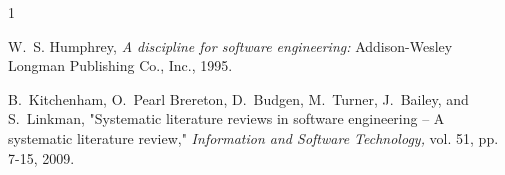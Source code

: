 \documentclass[conference,compsoc]{IEEEtran}
\begin{document}


%
%
%
\begin{thebibliography}{1}

W.~S. Humphrey, \emph{A discipline for software engineering:} Addison-Wesley Longman Publishing Co., Inc., 1995.

B.~Kitchenham, O.~Pearl Brereton, D.~Budgen, M.~Turner, J.~Bailey, and S.~Linkman, "Systematic literature reviews in software engineering – A systematic literature review," \emph{Information and Software Technology,} vol. 51, pp. 7-15, 2009.


\end{thebibliography}




\end{document}
